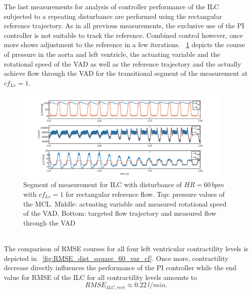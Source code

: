 The last measurements for analysis of controller performance of the ILC subjected to a repeating disturbance are performed using the rectangular reference trajectory. As in all previous measurements, the exclusive use of the PI controller is not suitable to track the reference. Combined control however, once more shows adjustment to the reference in a few iterations. \figurename~\ref{fig:pi_to_ilc_dist_square_60_cf1} depicts the course of pressure in the aorta and left ventricle, the actuating variable and the rotational speed of the VAD as well as the reference trajectory and the actually achieve flow through the VAD for the transitional segment of the measurement at $cf_{Lv}=1$.
\begin{figure}[ht!]
  \centering
  \includegraphics[width=0.95\textwidth]{images/chapt_5/ILC/pi_to_ilc_dist_square_60_cf1.pdf}
  \caption[Segment of measurement for ILC with disturbance of $HR=60\,bpm$ with $cf_{Lv}=1$ for rectangular reference flow]{Segment of measurement for ILC with disturbance of $HR=60\,bpm$ with $cf_{Lv}=1$ for rectangular reference flow. Top:  pressure values of the MCL. Middle: actuating variable and measured rotational speed of the VAD. Bottom: targeted flow trajectory and measured flow through the VAD}
  \label{fig:pi_to_ilc_dist_square_60_cf1}
\end{figure}
\\The comparison of RMSE courses for all four left ventricular contractility levels is depicted in \figurename~\ref{fig:RMSE_dist_square_60_var_cf}. Once more, contractility decrease directly influences the performance of the PI controller while the end value for RMSE of the ILC for all contractility levels amounts to
\begin{equation}
  RMSE_{ILC,rect}\approx 0.22\,l/min.
\end{equation}
